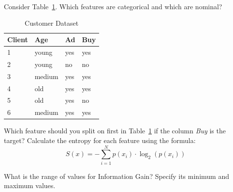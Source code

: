\documentclass[12pt]{article}
\begin{document}
    \begin{ejercicio}
        Consider Table~\ref{tab:customer_dataset}. Which features are categorical and which are nominal?

        \begin{table}[h!]
        \centering
        \begin{tabular}{|l|l|l|l|}
        \hline
        \textbf{Client} & \textbf{Age} & \textbf{Ad} & \textbf{Buy} \\ \hline
        1 & young & yes & yes \\ \hline
        2 & young & no & no \\ \hline
        3 & medium & yes & yes \\ \hline
        4 & old & yes & yes \\ \hline
        5 & old & yes & no \\ \hline
        6 & medium & yes & yes \\ \hline
        \end{tabular}
        \caption{Customer Dataset}
        \label{tab:customer_dataset}
        \end{table}
    \end{ejercicio}

    \begin{ejercicio}
        Which feature should you split on first in Table~\ref{tab:customer_dataset} if the column \textit{Buy} is the target? Calculate the entropy for each feature using the formula:
        \[ S(x) = -\sum_{i=1}^{N} p(x_i) \cdot \log_2(p(x_i)) \]
    \end{ejercicio}

    \begin{ejercicio}
        What is the range of values for Information Gain? Specify its minimum and maximum values.
    \end{ejercicio}
\end{document}
